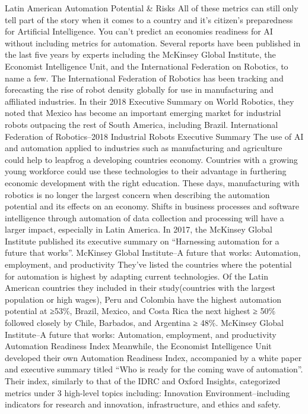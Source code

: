\documentclass[journal]{IEEEtran}
\begin{document}
Latin American Automation Potential \& Risks
All of these metrics can still only tell part of the story when it comes to a country and it’s citizen’s preparedness for Artificial Intelligence. You can’t predict an economies readiness for AI without including metrics for automation. Several reports have been published in the last five years by experts including the McKinsey Global Institute, the Economist Intelligence Unit, and the International Federation on Robotics, to name a few.
The International Federation of Robotics has been tracking and forecasting the rise of robot density globally for use in manufacturing and affiliated industries. In their 2018 Executive Summary on World Robotics, they noted that Mexico has become an important emerging market for industrial robots outpacing the rest of South America, including Brazil.
International Federation of Robotics--2018 Industrial Robots Executive Summary
The use of AI and automation applied to industries such as manufacturing and agriculture could help to leapfrog a developing countries economy. Countries with a growing young workforce could use these technologies to their advantage in furthering economic development with the right education.
These days, manufacturing with robotics is no longer the largest concern when describing the automation potential and its effects on an economy. Shifts in business processes and software intelligence through automation of data collection and processing will have a larger impact, especially in Latin America. In 2017, the McKinsey Global Institute published its executive summary on “Harnessing automation for a future that works”.
McKinsey Global Institute--A future that works: Automation, employment, and productivity
They’ve listed the countries where the potential for automation is highest by adapting current technologies. Of the Latin American countries they included in their study(countries with the largest population or high wages), Peru and Colombia have the highest automation potential at ≥53\%, Brazil, Mexico, and Costa Rica the next highest ≥ 50\% followed closely by Chile, Barbados, and Argentina ≥ 48\%.
McKinsey Global Institute--A future that works: Automation, employment, and productivity
Automation Readiness Index
Meanwhile, the Economist Intelligence Unit developed their own Automation Readiness Index, accompanied by a white paper and executive summary titled “Who is ready for the coming wave of automation”. Their index, similarly to that of the IDRC and Oxford Insights, categorized metrics under 3 high-level topics including:
Innovation Environment--including indicators for research and innovation, infrastructure, and ethics and safety.
\end{document}
